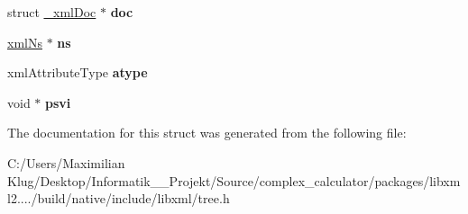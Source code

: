 \begin{DoxyCompactItemize}
struct \mbox{\hyperlink{struct__xml_doc}{\+\_\+xml\+Doc}} $\ast$ {\bfseries doc}
\item 
\mbox{\label{struct__xml_attr_a065c43de84bfa24525a9d2b971cf0fae}} 
\mbox{\hyperlink{struct__xml_ns}{xml\+Ns}} $\ast$ {\bfseries ns}
\item 
\mbox{\label{struct__xml_attr_a95fc30b9d2f4df9ffc8ee24d5926c63c}} 
xml\+Attribute\+Type {\bfseries atype}
\item 
\mbox{\label{struct__xml_attr_a6b5d144ded807d5384ab9ad4cf129454}} 
void $\ast$ {\bfseries psvi}
\end{DoxyCompactItemize}


The documentation for this struct was generated from the following file\+:\begin{DoxyCompactItemize}
\item 
C\+:/\+Users/\+Maximilian Klug/\+Desktop/\+Informatik\+\_\+\_\+\+Projekt/\+Source/complex\+\_\+calculator/packages/libxml2..../build/native/include/libxml/tree.\+h\end{DoxyCompactItemize}
